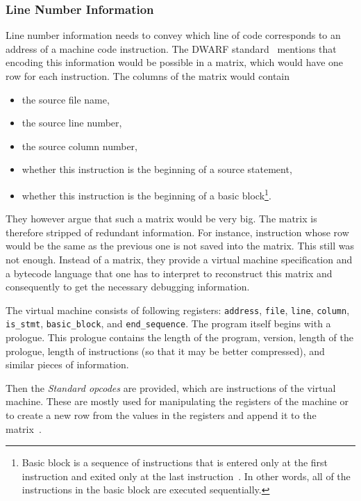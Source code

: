 \subsubsection{Line Number Information}\label{section:line-number-information}
Line number information needs to convey which line of code corresponds to an
address of a machine code instruction. The DWARF standard~\cite{dwarf} mentions
that encoding this information would be possible in a matrix, which would have
one row for each instruction. The columns of the matrix would contain
\begin{itemize}
    \item the source file name,
    \item the source line number,
    \item the source column number,
    \item whether this instruction is the beginning of a source statement,
    \item whether this instruction is the beginning of a basic
        block\footnote{Basic block is a sequence of instructions that is
        entered only at the first instruction and exited only at the last
        instruction~\cite{dwarf}. In other words, all of the instructions in
        the basic block are executed sequentially.}.
\end{itemize}
They however argue that such a matrix would be very big. The matrix is
therefore stripped of redundant information. For instance, instruction whose
row would be the same as the previous one is not saved into the matrix. This
still was not enough. Instead of a matrix, they provide a virtual machine
specification and a bytecode language that one has to interpret to reconstruct
this matrix and consequently to get the necessary debugging information.

The virtual machine consists of following registers: \texttt{address},
\texttt{file}, \texttt{line}, \texttt{column}, \texttt{is\_stmt},
\texttt{basic\_block}, and \texttt{end\_sequence}. The program itself begins
with a prologue. This prologue contains the length of the program, version,
length of the prologue, length of instructions (so that it may be better
compressed), and similar pieces of information. 

Then the \textit{Standard opcodes} are provided, which are instructions of the
virtual machine. These are mostly used for manipulating the registers of the
machine or to create a new row from the values in the registers and append it
to the matrix~\cite{dwarf}. 

